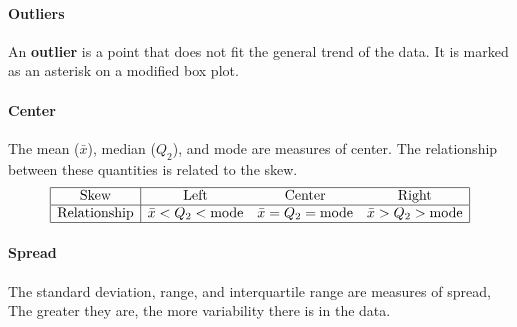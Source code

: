 \documentclass[../AP_Statistics.tex]{subfiles}
\begin{document}
				\paragraph{Outliers}
					An \textbf{outlier} is a point that does not fit the general trend of the data. It is marked as an asterisk on a modified box plot. \\
				\paragraph{Center}
					The mean ($\bar{x}$), median ($Q_2$), and mode are measures of center. The relationship between these quantities is related to the skew.
					$$\begin{array}{|c|ccc|}\hline
						\rm{Skew} & \rm{Left} & \rm{Center} & \rm{Right} \\\hline
						\rm{Relationship} & \bar{x} < Q_2 < \rm{mode} & \bar{x} = Q_2 = \rm{mode} & \bar{x} > Q_2 > \rm{mode} \\\hline
					\end{array}$$
				\paragraph{Spread}
					The standard deviation, range, and interquartile range are measures of spread, The greater they are, the more variability there is in the data.
\end{document}
